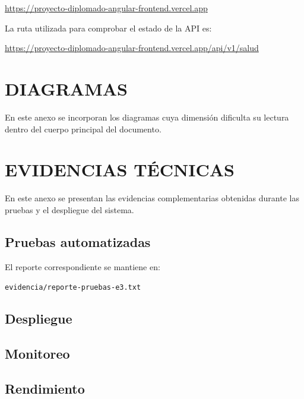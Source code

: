 \begin{center}
	
	\url{
		https://proyecto-diplomado-angular-frontend.vercel.app
	}
	
\end{center}

La ruta utilizada para comprobar el estado de la API es:

\begin{center}
	
	\url{
		https://proyecto-diplomado-angular-frontend.vercel.app/api/v1/salud
	}
	
\end{center}




\chapter{DIAGRAMAS}

En este anexo se incorporan los diagramas cuya dimensión dificulta su
lectura dentro del cuerpo principal del documento.

%




\chapter{EVIDENCIAS TÉCNICAS}

En este anexo se presentan las evidencias complementarias obtenidas durante
las pruebas y el despliegue del sistema.

\section*{Pruebas automatizadas}

El reporte correspondiente se mantiene en:

\begin{center}
	\texttt{evidencia/reporte-pruebas-e3.txt}
\end{center}

\section*{Despliegue}

%

\section*{Monitoreo}

%

\section*{Rendimiento}

%
